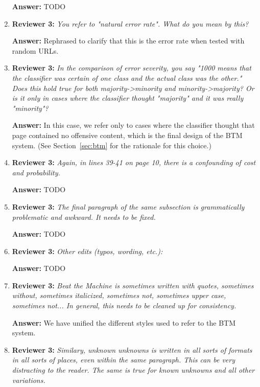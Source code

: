 \documentclass[letterpaper]{article}
\begin{document}
\begin{enumerate}
\textbf{Answer:} TODO

\item \textbf{Reviewer 3:} \emph{ You refer to "natural error rate".  What do you mean by this?}

\textbf{Answer:} Rephrased to clarify that this is the error rate when tested with random URLs.

\item \textbf{Reviewer 3:} \emph{ In the comparison of error severity, you say "1000 means that the classifier was certain of one class and the actual class was the other."  Does this hold true for both majority->minority and minority->majority?  Or is it only in cases where the classifier thought "majority" and it was really "minority"?}

\textbf{Answer:} In this case, we refer only to cases where the classifier thought that page contained no offensive content, which is the final design of the BTM system. (See Section~\ref{sec:btm} for the rationale for this choice.)

\item \textbf{Reviewer 3:} \emph{ Again, in lines 39-41 on page 10, there is a confounding of cost and probability.}

\textbf{Answer:} TODO

\item \textbf{Reviewer 3:} \emph{ The final paragraph of the same subsection is grammatically problematic and awkward.  It needs to be fixed.}

\textbf{Answer:} TODO

\item \textbf{Reviewer 3:} \emph{ Other edits (typos, wording, etc.):}

\textbf{Answer:} TODO

\item \textbf{Reviewer 3:} \emph{ Beat the Machine is sometimes written with quotes, sometimes without, sometimes italicized, sometimes not, sometimes upper case, sometimes not... In general, this needs to be cleaned up for consistency.}

\textbf{Answer:} We have unified the different styles used to refer to the BTM system.

\item \textbf{Reviewer 3:} \emph{ Similary, unknown unknowns is written in all sorts of formats in all sorts of places, even within the same paragraph.  This can be very distracting to the reader.  The same is true for known unknowns and all other variations.}


\end{enumerate}
\end{document}
